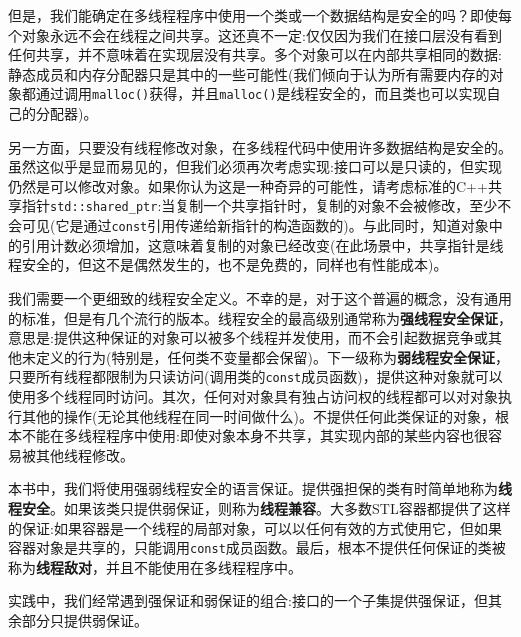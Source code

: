 但是，我们能确定在多线程程序中使用一个类或一个数据结构是安全的吗？即使每个对象永远不会在线程之间共享。这还真不一定:仅仅因为我们在接口层没有看到任何共享，并不意味着在实现层没有共享。多个对象可以在内部共享相同的数据:静态成员和内存分配器只是其中的一些可能性(我们倾向于认为所有需要内存的对象都通过调用\texttt{malloc()}获得，并且\texttt{malloc()}是线程安全的，而且类也可以实现自己的分配器)。

另一方面，只要没有线程修改对象，在多线程代码中使用许多数据结构是安全的。虽然这似乎是显而易见的，但我们必须再次考虑实现:接口可以是只读的，但实现仍然是可以修改对象。如果你认为这是一种奇异的可能性，请考虑标准的C++共享指针\texttt{std::shared\_ptr}:当复制一个共享指针时，复制的对象不会被修改，至少不会可见(它是通过\texttt{const}引用传递给新指针的构造函数的)。与此同时，知道对象中的引用计数必须增加，这意味着复制的对象已经改变(在此场景中，共享指针是线程安全的，但这不是偶然发生的，也不是免费的，同样也有性能成本)。

我们需要一个更细致的线程安全定义。不幸的是，对于这个普遍的概念，没有通用的标准，但是有几个流行的版本。线程安全的最高级别通常称为\textbf{强线程安全保证}，意思是:提供这种保证的对象可以被多个线程并发使用，而不会引起数据竞争或其他未定义的行为(特别是，任何类不变量都会保留)。下一级称为\textbf{弱线程安全保证}，只要所有线程都限制为只读访问(调用类的\texttt{const}成员函数)，提供这种对象就可以使用多个线程同时访问。其次，任何对对象具有独占访问权的线程都可以对对象执行其他的操作(无论其他线程在同一时间做什么)。不提供任何此类保证的对象，根本不能在多线程程序中使用:即使对象本身不共享，其实现内部的某些内容也很容易被其他线程修改。

本书中，我们将使用强弱线程安全的语言保证。提供强担保的类有时简单地称为\textbf{线程安全}。如果该类只提供弱保证，则称为\textbf{线程兼容}。大多数STL容器都提供了这样的保证:如果容器是一个线程的局部对象，可以以任何有效的方式使用它，但如果容器对象是共享的，只能调用\texttt{const}成员函数。最后，根本不提供任何保证的类被称为\textbf{线程敌对}，并且不能使用在多线程程序中。

实践中，我们经常遇到强保证和弱保证的组合:接口的一个子集提供强保证，但其余部分只提供弱保证。

